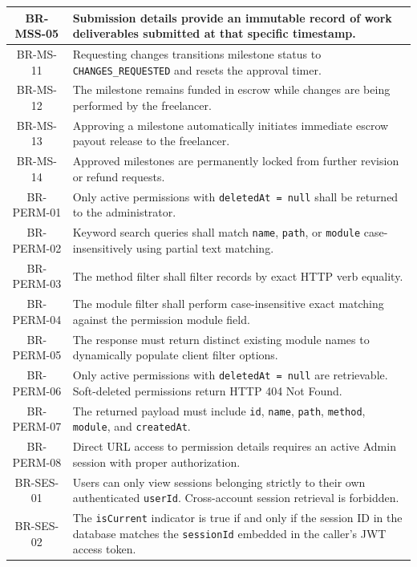 \begin{longtable}{|c|p{12cm}|}
    BR-MSS-05 & Submission details provide an immutable record of work deliverables submitted at that specific timestamp. \\ \hline
    BR-MS-11 & Requesting changes transitions milestone status to \texttt{CHANGES\_REQUESTED} and resets the approval timer. \\ \hline
    BR-MS-12 & The milestone remains funded in escrow while changes are being performed by the freelancer. \\ \hline
    BR-MS-13 & Approving a milestone automatically initiates immediate escrow payout release to the freelancer. \\ \hline
    BR-MS-14 & Approved milestones are permanently locked from further revision or refund requests. \\ \hline
    BR-PERM-01 & Only active permissions with \texttt{deletedAt = null} shall be returned to the administrator. \\ \hline
    BR-PERM-02 & Keyword search queries shall match \texttt{name}, \texttt{path}, or \texttt{module} case-insensitively using partial text matching. \\ \hline
    BR-PERM-03 & The method filter shall filter records by exact HTTP verb equality. \\ \hline
    BR-PERM-04 & The module filter shall perform case-insensitive exact matching against the permission module field. \\ \hline
    BR-PERM-05 & The response must return distinct existing module names to dynamically populate client filter options. \\ \hline
    BR-PERM-06 & Only active permissions with \texttt{deletedAt = null} are retrievable. Soft-deleted permissions return HTTP 404 Not Found. \\ \hline
    BR-PERM-07 & The returned payload must include \texttt{id}, \texttt{name}, \texttt{path}, \texttt{method}, \texttt{module}, and \texttt{createdAt}. \\ \hline
    BR-PERM-08 & Direct URL access to permission details requires an active Admin session with proper authorization. \\ \hline
    BR-SES-01 & Users can only view sessions belonging strictly to their own authenticated \texttt{userId}. Cross-account session retrieval is forbidden. \\ \hline
    BR-SES-02 & The \texttt{isCurrent} indicator is true if and only if the session ID in the database matches the \texttt{sessionId} embedded in the caller's JWT access token. \\ \hline

\end{longtable}
